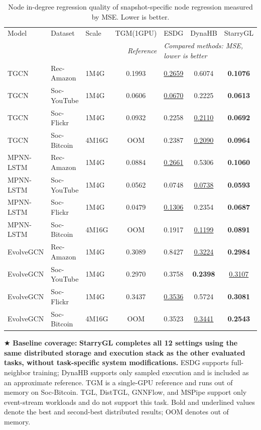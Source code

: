 \begin{table}[htbp]
\centering
\caption{Node in-degree regression quality of snapshot-specific node regression measured by MSE. Lower is
better.}
\vspace{-10pt}
\label{tab:dtdg_node_regression_current}
\scriptsize
\setlength{\tabcolsep}{4pt}
\begin{tabular}{lll|c|ccc}
\toprule
Model & Dataset & Scale & TGM(1GPU) & ESDG & DynaHB & StarryGL \\
\multicolumn{3}{r}{ } &\multicolumn{1}{r}{\textit{Reference}}  & \multicolumn{3}{l}{\textit{Compared methods: MSE, lower is better}} \\
\midrule
TGCN & Rec-Amazon & 1M4G & 0.1993 & \underline{0.2659} & 0.6074 & \textbf{0.1076} \\
TGCN & Soc-YouTube & 1M4G & 0.0606 & \underline{0.0670} & 0.2225 & \textbf{0.0613} \\
TGCN & Soc-Flickr & 1M4G & 0.0932 & 0.2258 & \underline{0.2110} & \textbf{0.0692} \\
TGCN & Soc-Bitcoin & 4M16G & OOM & 0.2387 & \underline{0.2090} & \textbf{0.0964} \\
\midrule
MPNN-LSTM & Rec-Amazon & 1M4G & 0.0884 & \underline{0.2661} & 0.5306 & \textbf{0.1060} \\
MPNN-LSTM & Soc-YouTube & 1M4G & 0.0562 & 0.0748 & \underline{0.0738} & \textbf{0.0593} \\
MPNN-LSTM & Soc-Flickr & 1M4G & 0.0479 & \underline{0.1306} & 0.2354 & \textbf{0.0687} \\
MPNN-LSTM & Soc-Bitcoin & 4M16G & OOM & 0.1917 & \underline{0.1199} & \textbf{0.0891} \\
\midrule
EvolveGCN & Rec-Amazon & 1M4G & 0.3089 & 0.8427 & \underline{0.3224} & \textbf{0.2984} \\
EvolveGCN & Soc-YouTube & 1M4G & 0.2970 & 0.3758 & \textbf{0.2398} & \underline{0.3107} \\
EvolveGCN & Soc-Flickr & 1M4G & 0.3437 & \underline{0.3536} & 0.5724 & \textbf{0.3081} \\
EvolveGCN & Soc-Bitcoin & 4M16G & OOM & 0.3523 & \underline{0.3441} & \textbf{0.2543} \\
\bottomrule
\end{tabular}

\begin{minipage}{\linewidth}
\scriptsize
$\bigstar$ \textbf{Baseline coverage:}
\textbf{StarryGL completes all 12 settings using the same distributed
storage and execution stack as the other evaluated tasks, without
task-specific system modifications.} ESDG supports full-neighbor training; DynaHB supports only sampled
execution and is included as an approximate reference. TGM is a
single-GPU reference and runs out of memory on Soc-Bitcoin. TGL,
DistTGL, GNNFlow, and MSPipe support only event-stream workloads and
do not support this task. Bold and underlined values denote the best
and second-best distributed results; OOM denotes out of memory.
\end{minipage}
\vspace{-20pt}
\end{table}

